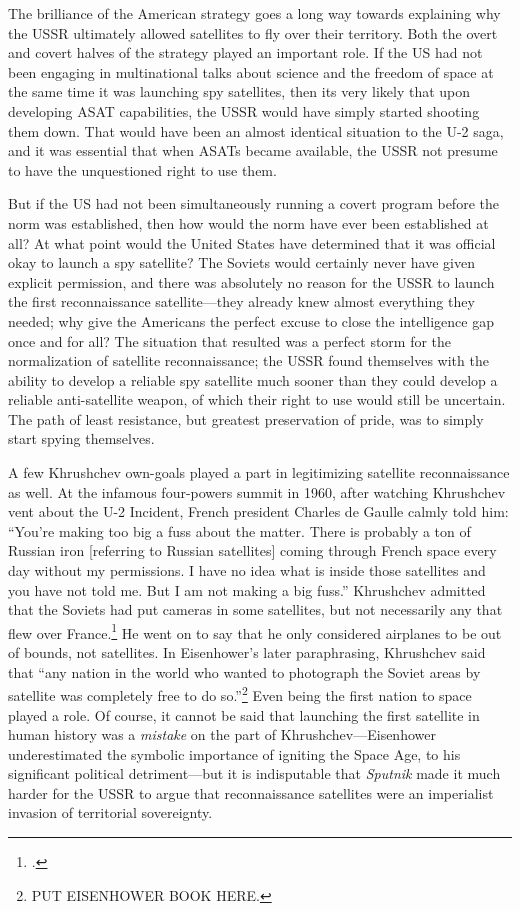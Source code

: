 \documentclass{report}
\begin{document}
The brilliance of the American strategy goes a long way towards explaining why the USSR ultimately allowed satellites to fly over their territory. Both the overt and covert halves of the strategy played an important role. If the US had not been engaging in multinational talks about science and the freedom of space at the same time it was launching spy satellites, then its very likely that upon developing ASAT capabilities, the USSR would have simply started shooting them down. That would have been an almost identical situation to the U-2 saga, and it was essential that when ASATs became available, the USSR not presume to have the unquestioned right to use them.

But if the US had not been simultaneously running a covert program before the norm was established, then how would the norm have ever been established at all? At what point would the United States have determined that it was official okay to launch a spy satellite? The Soviets would certainly never have given explicit permission, and there was absolutely no reason for the USSR to launch the first reconnaissance satellite---they already knew almost everything they needed; why give the Americans the perfect excuse to close the intelligence gap once and for all? The situation that resulted was a perfect storm for the normalization of satellite reconnaissance; the USSR found themselves with the ability to develop a reliable spy satellite much sooner than they could develop a reliable anti-satellite weapon, of which their right to use would still be uncertain. The path of least resistance, but greatest preservation of pride, was to simply start spying themselves.

A few Khrushchev own-goals played a part in legitimizing satellite reconnaissance as well. At the infamous four-powers summit in 1960, after watching Khrushchev vent about the U-2 Incident, French president Charles de Gaulle calmly told him: ``You're making too big a fuss about the matter. There is probably a ton of Russian iron [referring to Russian satellites] coming through French space every day without my permissions. I have no idea what is inside those satellites and you have not told me. But I am not making a big fuss.'' Khrushchev admitted that the Soviets had put cameras in some satellites, but not necessarily any that flew over France.\footcite[p.~353]{brugioni_eyes_2010} He went on to say that he only considered airplanes to be out of bounds, not satellites. In Eisenhower's later paraphrasing, Khrushchev said that ``any nation in the world who wanted to photograph the Soviet areas by satellite was completely free to do so.''\footnote{PUT EISENHOWER BOOK HERE.} Even being the first nation to space played a role. Of course, it cannot be said that launching the first satellite in human history was a \emph{mistake} on the part of Khrushchev---Eisenhower underestimated the symbolic importance of igniting the Space Age, to his significant political detriment---but it is indisputable that \emph{Sputnik} made it much harder for the USSR to argue that reconnaissance satellites were an imperialist invasion of territorial sovereignty.
\end{document}
